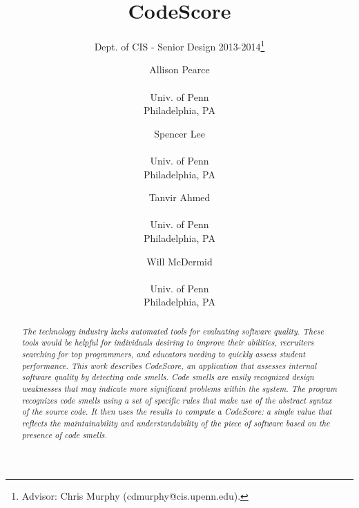 \documentclass{sig-alternate}
\begin{document}

\title{CodeScore}
\subtitle{Dept. of CIS - Senior Design 2013-2014\thanks{Advisor: Chris Murphy (cdmurphy@cis.upenn.edu).}}

\author{
	Allison Pearce \\  \\ Univ. of Penn \\ Philadelphia, PA
	\and Spencer Lee \\  \\ Univ. of Penn \\ Philadelphia, PA
	\and Tanvir Ahmed \\  \\ Univ. of Penn \\ Philadelphia, PA
\and Will McDermid \\  \\ Univ. of Penn \\ Philadelphia, PA}

\date{}
\maketitle

\begin{abstract}
	\textit{The technology industry lacks automated tools for evaluating software
		quality. These tools would be helpful for individuals desiring to improve
		their abilities, recruiters searching for top programmers, and educators
		needing to quickly assess student performance. This work describes
		CodeScore, an application that assesses internal software
	quality by detecting code smells. Code smells are easily recognized design
weaknesses that may indicate more significant problems within the system. The
program recognizes code smells using a set of specific rules that make use of the
abstract syntax of the source code. It then
uses the results to compute a CodeScore: a single value that reflects the
maintainability and understandability of the piece of software based on the
presence of code smells. }
\end{abstract}

\end{document}
